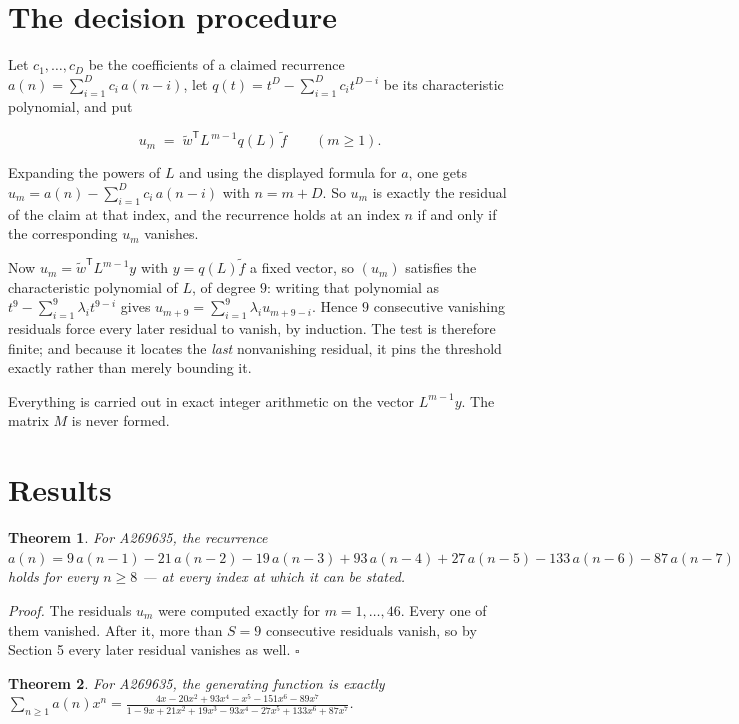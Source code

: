 \documentclass[11pt]{article}
\newtheorem{theorem}{Theorem}
\theoremstyle{definition}
\begin{document}
\section{The decision procedure}

Let $c_1,\dots,c_D$ be the coefficients of a claimed recurrence $a(n) = \sum_{i=1}^{D} c_i\,a(n-i)$, let $q(t) = t^{D} - \sum_{i=1}^{D} c_i t^{D-i}$ be its characteristic polynomial, and put

\[u_m \;=\; \tilde w^{\mathsf T} L^{\,m-1} q(L)\,\tilde f \qquad (m \ge 1).\]

Expanding the powers of $L$ and using the displayed formula for $a$, one gets $u_m = a(n) - \sum_{i=1}^{D} c_i\,a(n-i)$ with $n = m + D$. So $u_m$ is exactly the residual of the claim at that index, and the recurrence holds at an index $n$ if and only if the corresponding $u_m$ vanishes.

Now $u_m = \tilde w^{\mathsf T} L^{m-1} y$ with $y = q(L)\tilde f$ a fixed vector, so $(u_m)$ satisfies the characteristic polynomial of $L$, of degree $9$: writing that polynomial as $t^{9} - \sum_{i=1}^{9} \lambda_i t^{9-i}$ gives $u_{m+9} = \sum_{i=1}^{9} \lambda_i u_{m+9-i}$. Hence $9$ consecutive vanishing residuals force every later residual to vanish, by induction. The test is therefore finite; and because it locates the {\itshape last} nonvanishing residual, it pins the threshold exactly rather than merely bounding it.

Everything is carried out in exact integer arithmetic on the vector $L^{m-1}y$. The matrix $M$ is never formed.

\section{Results}

\begin{theorem} For A269635, the recurrence $a(n) = 9\,a(n-1) - 21\,a(n-2) - 19\,a(n-3) + 93\,a(n-4) + 27\,a(n-5) - 133\,a(n-6) - 87\,a(n-7)$ holds for every $n \ge 8$ --- at every index at which it can be stated.\end{theorem}

{\itshape Proof.} The residuals $u_m$ were computed exactly for $m = 1,\dots,46$. Every one of them vanished. After it, more than $S = 9$ consecutive residuals vanish, so by Section 5 every later residual vanishes as well. $\square$

\begin{theorem} For A269635, the generating function is exactly $\sum_{n\ge 1} a(n)x^n = \frac{4x - 20x^{2} + 93x^{4} - x^{5} - 151x^{6} - 89x^{7}}{1 - 9x + 21x^{2} + 19x^{3} - 93x^{4} - 27x^{5} + 133x^{6} + 87x^{7}}$.\end{theorem}
\end{document}
